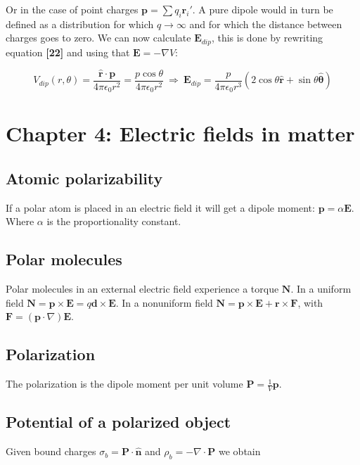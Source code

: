 \documentclass[a4paper]{article}
\begin{document}
Or in the case of point charges $\bm{p}=\sum q_i \bm{r}_i'$. A pure dipole would in turn be defined as a distribution for which $q\rightarrow \infty$ and for which the distance between charges goes to zero. We can now calculate $\bm{E}_{dip}$, this is done by rewriting equation \textbf{[22]} and using that $\bm{E}=-\nabla V$:

\begin{equation}
    V_{dip}(r, \theta)=\frac{\hat{\bm{r}}\cdot\bm{p}}{4\pi\epsilon_0 r^2}=\frac{p\cos\theta}{4\pi\epsilon_0 r^2}\ \Rightarrow\ \bm{E}_{dip}=\frac{p}{4\pi\epsilon_0 r^3}(2\cos\theta\hat{\bm{r}}+\sin\theta\hat{\bm{\theta}})
\end{equation}

\section{Chapter 4: Electric fields in matter}

\subsection{Atomic polarizability}

If a polar atom is placed in an electric field it will get a dipole moment: $\bm{p}=\alpha\bm{E}$. Where $\alpha$ is the proportionality constant.

\subsection{Polar molecules}

Polar molecules in an external electric field experience a torque $\bm{N}$. In a uniform field $\bm{N}=\bm{p}\times\bm{E}=q\bm{d}\times\bm{E}$. In a nonuniform field $\bm{N}=\bm{p}\times\bm{E}+\bm{r}\times\bm{F}$, with $\bm{F}=(\bm{p}\cdot\nabla)\bm{E}$.

\subsection{Polarization}

The polarization is the dipole moment per unit volume $\bm{P}=\frac{1}{V}\bm{p}$.

\subsection{Potential of a polarized object}

Given bound charges $\sigma_b=\bm{P}\cdot\bm{\hat{n}}$ and $\rho_b=-\nabla\cdot\bm{P}$ we obtain
\end{document}
